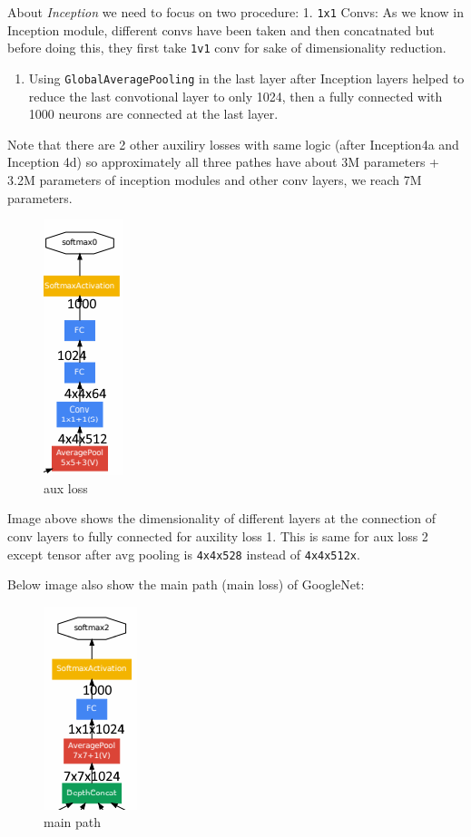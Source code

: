 \documentclass[11pt]{article}
\makeatletter
\def\maxwidth{\ifdim\Gin@nat@width>\linewidth\linewidth
    \else\Gin@nat@width\fi}
\let\Oldincludegraphics\includegraphics
\renewcommand{\includegraphics}[1]{\Oldincludegraphics[width=.8\maxwidth]{#1}}
\providecommand{\tightlist}{%
      \setlength{\itemsep}{0pt}\setlength{\parskip}{0pt}}
\makeatother
\begin{document}
About \emph{Inception} we need to focus on two procedure: 1.
\texttt{1x1} Convs: As we know in Inception module, different convs have
been taken and then concatnated but before doing this, they first take
\texttt{1v1} conv for sake of dimensionality reduction.

\begin{enumerate}
\def\labelenumi{\arabic{enumi}.}
\setcounter{enumi}{1}
\tightlist
\item
  Using \texttt{GlobalAveragePooling} in the last layer after Inception
  layers helped to reduce the last convotional layer to only 1024, then
  a fully connected with 1000 neurons are connected at the last layer.
\end{enumerate}

Note that there are 2 other auxiliry losses with same logic (after
Inception4a and Inception 4d) so approximately all three pathes have
about 3M parameters + 3.2M parameters of inception modules and other
conv layers, we reach 7M parameters.

\begin{figure}
\centering
\includegraphics{wiki/1_d_4.png}
\caption{aux loss}
\end{figure}

Image above shows the dimensionality of different layers at the
connection of conv layers to fully connected for auxility loss 1. This
is same for aux loss 2 except tensor after avg pooling is
\texttt{4x4x528} instead of \texttt{4x4x512x}.

Below image also show the main path (main loss) of GoogleNet:

\begin{figure}
\centering
\includegraphics{wiki/1_d_5.png}
\caption{main path}
\end{figure}
\end{document}
